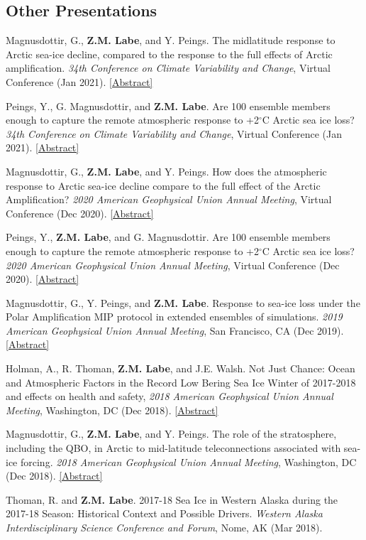 \documentclass[margin,line,palatino,courier,10pt]{res}
\begin{document}
\begin{resume}
\section{\sc \textcolor{Cerulean}{\large{\textbf{Other Presentations}}}} 
\begin{etaremune}[leftmargin=0in,topsep=0in,parsep=0in]
\item Magnusdottir, G., \textbf{Z.M. Labe}, and Y. Peings. The midlatitude response to Arctic sea-ice decline, compared to the response to the full effects of Arctic amplification. \textit{34th Conference on Climate Variability and Change}, Virtual Conference (Jan 2021). \href{https://ams.confex.com/ams/101ANNUAL/meetingapp.cgi/Paper/382356}{[Abstract]}
\item Peings, Y., G. Magnusdottir, and \textbf{Z.M. Labe}. Are 100 ensemble members enough to capture the remote atmospheric response to +2$^{\circ}$C Arctic sea ice loss? \textit{34th Conference on Climate Variability and Change}, Virtual Conference (Jan 2021). \href{https://ams.confex.com/ams/101ANNUAL/meetingapp.cgi/Paper/382352}{[Abstract]}
\item Magnusdottir, G., \textbf{Z.M. Labe}, and Y. Peings. How does the atmospheric response to Arctic sea-ice decline compare to the full effect of the Arctic Amplification? \textit{2020 American Geophysical Union Annual Meeting}, Virtual Conference (Dec 2020). \href{https://agu.confex.com/agu/fm20/meetingapp.cgi/Paper/678706}{[Abstract]}
\item Peings, Y., \textbf{Z.M. Labe}, and G. Magnusdottir. Are 100 ensemble members enough to capture the remote atmospheric response to +2$^{\circ}$C Arctic sea ice loss? \textit{2020 American Geophysical Union Annual Meeting}, Virtual Conference (Dec 2020). \href{https://agu.confex.com/agu/fm20/meetingapp.cgi/Paper/685885}{[Abstract]}
\item Magnusdottir, G., Y. Peings, and \textbf{Z.M. Labe}. Response to sea-ice loss under the Polar Amplification MIP protocol in extended ensembles of simulations. \textit{2019 American Geophysical Union Annual Meeting}, San Francisco, CA (Dec 2019). \href{https://agu.confex.com/agu/fm19/meetingapp.cgi/Paper/553470}{[Abstract]}
\item Holman, A., R. Thoman, \textbf{Z.M. Labe}, and J.E. Walsh. Not Just Chance: Ocean and Atmospheric Factors in the Record Low Bering Sea Ice Winter of 2017-2018 and effects on health and safety, \textit{2018 American Geophysical Union Annual Meeting}, Washington, DC (Dec 2018). \href{https://agu.confex.com/agu/fm18/meetingapp.cgi/Paper/451295}{[Abstract]}
\item Magnusdottir, G., \textbf{Z.M. Labe}, and Y. Peings. The role of the stratosphere, including the QBO, in Arctic to mid-latitude teleconnections associated with sea-ice forcing. \textit{2018 American Geophysical Union Annual Meeting}, Washington, DC (Dec 2018). \href{https://agu.confex.com/agu/fm18/meetingapp.cgi/Paper/399117}{[Abstract]}
\item Thoman, R. and \textbf{Z.M. Labe}. 2017-18 Sea Ice in Western Alaska during the 2017-18 Season: Historical Context and Possible Drivers. \textit{Western Alaska Interdisciplinary Science Conference and Forum}, Nome, AK (Mar 2018). 


\end{etaremune}
\end{resume}
\end{document}
